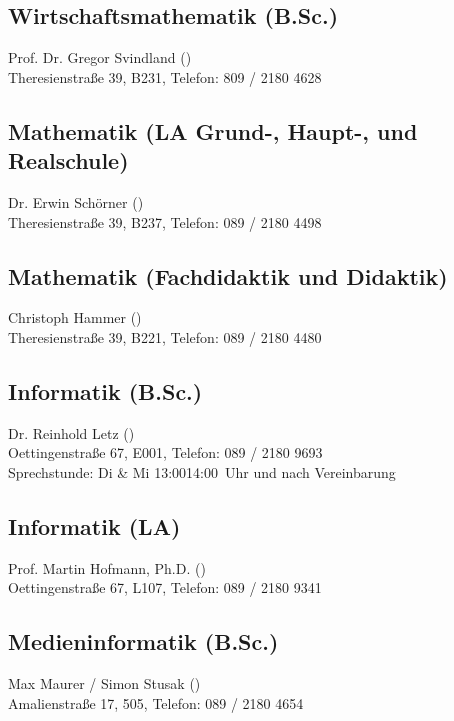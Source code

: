 \subsection*{Wirtschaftsmathematik (B.Sc.)\subjectList{\subjectW}}
Prof. Dr. Gregor Svindland ()\\
Theresienstraße 39, B231, Telefon: 809 / 2180 \emd{} 4628

\subsection*{Mathematik (LA Grund-, Haupt-, und Realschule)\subjectList{\subjectM}}
Dr. Erwin Schörner ()\\
Theresienstraße 39, B237, Telefon: 089 / 2180 \emd{} 4498

\subsection*{Mathematik (Fachdidaktik und Didaktik)\subjectList{\subjectM}}
Christoph Hammer ()\\ %
Theresienstraße 39, B221, Telefon: 089 / 2180 \emd{} 4480

\subsection*{Informatik (B.Sc.)\subjectList{\subjectI}}
Dr. Reinhold Letz ()\\
Oettingenstraße 67, E001, Telefon: 089 / 2180 \emd{} 9693\\
Sprechstunde: Di \& Mi 13:00\emd{}14:00~Uhr und nach Vereinbarung

\subsection*{Informatik (LA)\subjectList{\subjectI}}
Prof. Martin Hofmann, Ph.D. ()\\
Oettingenstraße 67, L107, Telefon: 089 / 2180 \emd{} 9341

\subsection*{Medieninformatik (B.Sc.)\subjectList{\subjectMI}}
Max Maurer / Simon Stusak ()\\
Amalienstraße 17, 505, Telefon: 089 / 2180 \emd{} 4654

